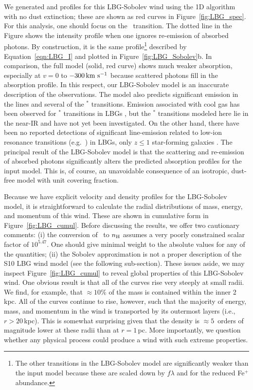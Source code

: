 \documentclass[12pt,preprint]{aastex}
\begin{document}
We generated  and  profiles for this LBG-Sobolev
wind
using the 1D algorithm with no dust extinction; these are shown as
red curves in Figure~\ref{fig:LBG_spec}.   For this analysis, one
should focus on the \mgiia\ transition.  The dotted line in the Figure
shows the intensity profile when one ignores re-emission
of absorbed photons.  By construction, it is the same profile\footnote{
  The other transitions in
  the LBG-Sobolev model are significantly weaker than the input model
  because these are scaled down by $f\lambda$ and 
  for  the reduced Fe$^+$ abundance.} 
described by Equation~\ref{eqn:LBG_I} and plotted in
Figure~\ref{fig:LBG_Sobolev}b.   In comparison, the full model (solid,
red curve)
shows much weaker absorption, especially at $v = 0$ to $-300 \, {\rm km~s^{-1}}$
because scattered photons fill in the absorption profile.
In this respect, our LBG-Sobolev model is an
inaccurate description of the observations. The model
also predicts significant emission in the  lines and several of
the $^*$ transitions.   Emission associated with cool gas
has been observed for $^*$
transitions in LBGs \citep{prs+02,shapley03}, but
the $^*$ transitions
modeled here lie in the near-IR and have not yet been investigated.
On the other hand, there have been no 
reported detections of significant line-emission related to low-ion resonance
transitions (e.g.\ ) in LBGs, only $z \le 1$ star-forming galaxies
\citep{wcp+09,rwk+10}.  
The principal result of the LBG-Sobolev model is that the scattering and re-emission of
absorbed photons significantly alters the predicted absorption profiles
for the input %
model.  This is, of course, an unavoidable
consequence of an isotropic, dust-free model with unit covering
fraction.

Because we have explicit velocity and density profiles for the LBG-Sobolev
model, it is straightforward to calculate the radial
distributions of mass, energy, and momentum of
this wind.  These are shown in cumulative form in
Figure~\ref{fig:LBG_cumul}.  Before discussing the results, we offer
two cautionary comments: (i) the conversion of \nmg\ to $n_{\rm H}$
assumes a very poorly constrained scalar factor of $10^{5.47}$.  One
should give minimal weight to the absolute values for any of the
quantities;
(ii) the Sobolev approximation is not a proper description of the S10
LBG wind model (see the following sub-section).
These issues aside, we may inspect Figure~\ref{fig:LBG_cumul} to reveal
global properties of this LBG-Sobolev wind.
One obvious result is that all of the curves rise very steeply at
small radii.  We find, for example, that $\approx 10\%$ of the mass is
contained within the inner 2\,kpc.  All of the curves continue to
rise, however, such that the majority of energy, mass, and momentum in
the wind is transported by its outermost layers (i.e., $r > 20$\,kpc).
This is somewhat surprising given that the density is $\approx
5$~orders of magnitude lower at these radii than at $r = 1$\,pc.
More importantly, we question whether any physical process could
produce a wind with such extreme properties. 
\end{document}
